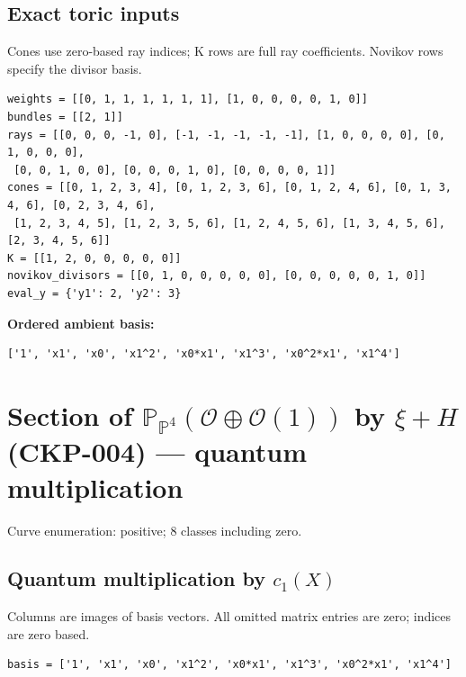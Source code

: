 \documentclass[10pt,a4paper]{article}
\begin{document}
\subsection*{Exact toric inputs}
Cones use zero-based ray indices; K rows are full ray coefficients. Novikov rows specify the divisor basis.

\begin{lstlisting}
weights = [[0, 1, 1, 1, 1, 1, 1], [1, 0, 0, 0, 0, 1, 0]]
bundles = [[2, 1]]
rays = [[0, 0, 0, -1, 0], [-1, -1, -1, -1, -1], [1, 0, 0, 0, 0], [0, 1, 0, 0, 0],
 [0, 0, 1, 0, 0], [0, 0, 0, 1, 0], [0, 0, 0, 0, 1]]
cones = [[0, 1, 2, 3, 4], [0, 1, 2, 3, 6], [0, 1, 2, 4, 6], [0, 1, 3, 4, 6], [0, 2, 3, 4, 6],
 [1, 2, 3, 4, 5], [1, 2, 3, 5, 6], [1, 2, 4, 5, 6], [1, 3, 4, 5, 6], [2, 3, 4, 5, 6]]
K = [[1, 2, 0, 0, 0, 0, 0]]
novikov_divisors = [[0, 1, 0, 0, 0, 0, 0], [0, 0, 0, 0, 0, 1, 0]]
eval_y = {'y1': 2, 'y2': 3}
\end{lstlisting}

\textbf{Ordered ambient basis:}
\begin{lstlisting}
['1', 'x1', 'x0', 'x1^2', 'x0*x1', 'x1^3', 'x0^2*x1', 'x1^4']
\end{lstlisting}

\clearpage\section*{Section of $\mathbb P_{\mathbb P^{4}}(\mathcal O\oplus \mathcal O(1))$ by $\xi +H$ (CKP-004) --- quantum multiplication}

Curve enumeration: positive; 8 classes including zero.
\subsection*{Quantum multiplication by $c_1(X)$}
Columns are images of basis vectors. All omitted matrix entries are zero; indices are zero based.

\begin{lstlisting}
basis = ['1', 'x1', 'x0', 'x1^2', 'x0*x1', 'x1^3', 'x0^2*x1', 'x1^4']
\end{lstlisting}
\end{document}
